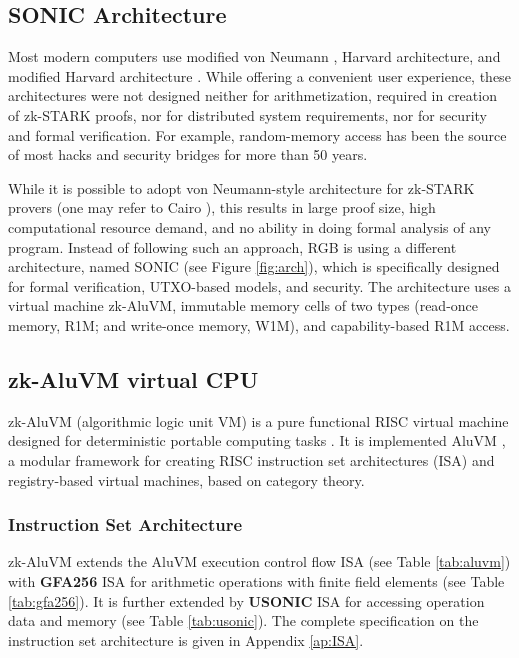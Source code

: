 \documentclass[9pt,oneside]{amsart}
\begin{document}
\begin{multicols}{2}

\section{SONIC Architecture}\label{Sonic}

Most modern computers use modified von Neumann \cite{vonNeumann},
Harvard architecture, and modified Harvard architecture \cite{Harvard}.
While offering a convenient user experience, these architectures were not designed neither for
arithmetization, required in creation of zk-STARK proofs, nor for distributed system requirements,
nor for security and formal verification.
For example, random-memory access has been the source
of most hacks and security bridges for more than 50 years.

While it is possible to adopt von Neumann-style architecture for zk-STARK provers
(one may refer to Cairo \cite{Cairo}), this results in large proof size,
high computational resource demand, and no ability in doing formal analysis of any program.
Instead of following such an approach, RGB is using a different architecture,
named SONIC (see Figure \ref{fig:arch}),
which is specifically designed for formal verification, UTXO-based models, and security.
The architecture uses a virtual machine zk-AluVM, immutable memory cells of two types
(read-once memory, R1M; and write-once memory, W1M), and capability-based R1M access.

\subsection{zk-AluVM virtual CPU}\label{AluVM}

zk-AluVM (algorithmic logic unit VM) is a pure functional RISC virtual machine
designed for deterministic portable computing tasks \cite{zkAluVM}.
It is implemented AluVM \cite{AluVM, AluVMCrate},
a modular framework for creating  RISC instruction set architectures (ISA)
and registry-based virtual machines, based on category theory.

\subsubsection{Instruction Set Architecture}

zk-AluVM extends the AluVM execution control flow ISA (see Table \ref{tab:aluvm})
with \textbf{GFA256} ISA for arithmetic operations
with finite field elements (see Table \ref{tab:gfa256}).
It is further extended by \textbf{USONIC} ISA
for accessing operation data and memory (see Table \ref{tab:usonic}).
The complete specification on the instruction set architecture is given in Appendix \ref{ap:ISA}.


\end{multicols}
\end{document}
